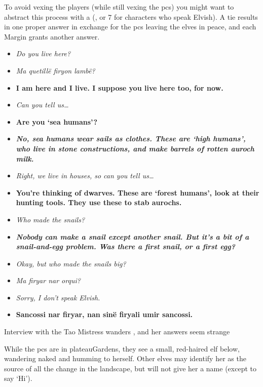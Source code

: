 \begin{multicols}{2}
To avoid vexing the players (while still vexing the \glspl{pc}) you might want to abstract this process with a  (\tn[10], or 7 for characters who speak Elvish).
A tie results in one proper answer in exchange for the \glspl{pc} leaving the elves in peace, and each Margin grants another answer.

\begin{itemize}
  \item\it
  Do you live here?
  \item[\adforn{51}]\sl
  Ma quetill\"e firyon lamb\"e?
  \item[\adforn{53}]\bf
  I am here and I live.
  I suppose you live here too, for now.
  \item\it
  Can you tell us\ldots
  \item[\adforn{53}]\bf
  Are you `sea humans'?
  \item[\adforn{52}]\bf\sl
  No, sea humans wear sails as clothes. 
  These are `high humans', who live in stone constructions, and make barrels of rotten auroch milk.
  \item\it
  Right, we live in houses, so can you tell us\ldots
  \item[\adforn{53}]\bf
  You're thinking of dwarves.
  These are `forest humans', look at their hunting tools.
  They use these to stab aurochs.
  \item\it
  Who made the snails?
  \item[\adforn{52}]\bf\sl
  Nobody can make a snail except another snail.
  But it's a bit of a snail-and-egg problem.
  Was there a first snail, or a first egg?
  \item\it
  Okay, but who made the snails \emph{big}?
  \item[\adforn{51}]\sl
  Ma firyar nar orqui?
  \item\it
  Sorry, I don't speak Elvish.
  \item[\adforn{53}]\bf
  Sancossi nar firyar, nan sin\"e firyali umir sancossi.
\end{itemize}


\showStdSpells


\showStdSpells

{Interview with the Tao Mistress}%
{ wanders , and her answers seem strange}%

While the \glspl{pc} are in \gls{plateauGardens}, they see a small, red-haired elf below, wandering naked and humming to herself.
Other elves may identify her as the source of all the change in the landscape, but will not give her a name (except to say `Hi').


\end{multicols}
